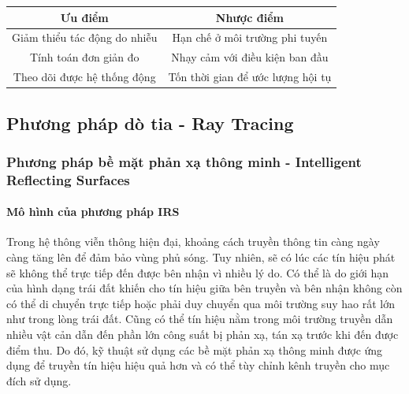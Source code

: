 \documentclass{article}
\begin{document}
\begin{center}
    \begin{tabular}{c|c}
         \textbf{Ưu điểm}&\textbf{Nhược điểm}  \\
         \hline
         Giảm thiểu tác động do nhiễu&Hạn chế ở môi trường phi tuyến\\
         Tính toán đơn giản đo & Nhạy cảm với điều kiện ban đầu\\
         Theo dõi được hệ thống động & Tốn thời gian để ước lượng hội tụ \\

    \end{tabular}
\end{center}
\subsection{Phương pháp dò tia - Ray Tracing}
\subsubsection{Phương pháp bề mặt phản xạ thông minh - Intelligent Reflecting Surfaces}
\paragraph{Mô hình của phương pháp IRS} Trong hệ thông viễn thông hiện đại, khoảng cách truyền thông tin càng ngày càng tăng lên để đảm bảo vùng phủ sóng. Tuy nhiên, sẽ có lúc các tín hiệu phát sẽ không thể trực tiếp đến được bên nhận vì nhiều lý do. Có thể là do giới hạn của hình dạng trái đất khiến cho tín hiệu giữa bên truyền và bên nhận không còn có thể di chuyển trực tiếp hoặc phải duy chuyển qua môi trường suy hao rất lớn như trong lòng trái đất. Cũng có thể tín hiệu nằm trong môi trường truyền dẫn nhiều vật cản dẫn đến phần lớn công suất bị phản xạ, tán xạ trước khi đến được điểm thu. Do đó, kỹ thuật sử dụng các bề mặt phản xạ thông minh được ứng dụng để truyền tín hiệu hiệu quả hơn và có thể tùy chỉnh kênh truyền cho mục đích sử dụng.\\
\end{document}

